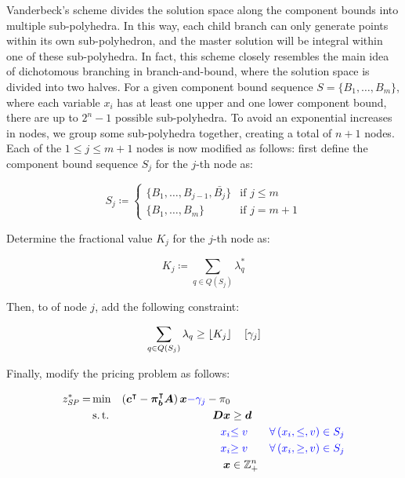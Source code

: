 Vanderbeck's scheme divides the solution space along the component bounds into multiple sub-polyhedra. In this way, each child branch can only generate points within its own sub-polyhedron, and the master solution will be integral within one of these sub-polyhedra. In fact, this scheme closely resembles the main idea of dichotomous branching in branch-and-bound, where the solution space is divided into two halves. For a given component bound sequence $S = \{B_1, \dots, B_m\}$, where each variable $x_i$ has at least one upper and one lower component bound, there are up to $2^n - 1$ possible sub-polyhedra. To avoid an exponential increases in nodes, we group some sub-polyhedra together, creating a total of $n + 1$ nodes. Each of the $1 \leq j \leq m+1$ nodes is now modified as follows: first define the component bound sequence $S_j$ for the $j$-th node as:

\begin{equation}
S_j \coloneqq
\begin{cases}
\{B_1, \dots, B_{j-1}, \bar{B_j}\} & \text{if } j \leq m \\
\{B_1, \dots, B_m\} & \text{if } j = m+1
\end{cases}
\end{equation}

Determine the fractional value $K_j$ for the $j$-th node as:

\begin{equation}
K_j \coloneqq \sum_{q \in Q(S_j)} \lambda_q^*
\end{equation}

Then, to \RMP{} of node $j$, add the following constraint:

\begin{equation}
\sum_{q \in Q(S_j)} \lambda_q \geq \lfloor K_j\rfloor \quad \left[\gamma_j\right]
\end{equation}

Finally, modify the pricing problem as follows:

\begin{equation}
\begin{aligned}
z^*_\SP{} = &\min & \left( \vec{c}\transpose - \vec{\pi}_\vec{b}\transpose \mat{A} \right) \vec{x} {\color{blue} - \gamma_j} - \pi_0 & \\
&\st & \mat{D} \vec{x} & \geq \vec{d} \\
&& {\color{blue} x_i} & {\color{blue} \leq v} & {\color{blue} \forall \left( x_i, \leq, v \right) \in S_j} \\
&& {\color{blue} x_i} & {\color{blue} \geq v} & {\color{blue} \forall \left( x_i, \geq, v \right) \in S_j} \\
&& \vec{x} & \in \mathbb{Z}_+^n
\end{aligned}
\end{equation}


